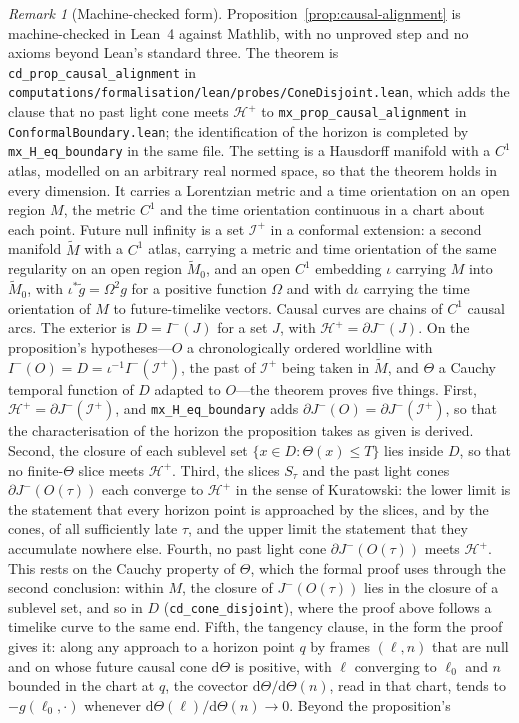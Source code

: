 \documentclass[11pt,a4paper]{article}
\theoremstyle{plain}
\theoremstyle{remark}
\newtheorem{remark}{Remark}
\begin{document}
\begin{remark}[Machine-checked form]\label{rem:formalised}
Proposition~\ref{prop:causal-alignment} is machine-checked in Lean~4 against Mathlib, with no unproved step and no axioms beyond Lean's standard three. The theorem is \texttt{cd\_prop\_causal\_alignment} in \texttt{computations/formalisation/lean/probes/ConeDisjoint.lean}, which adds the clause that no past light cone meets $\mathcal{H}^+$ to \texttt{mx\_prop\_causal\_alignment} in \texttt{ConformalBoundary.lean}; the identification of the horizon is completed by \texttt{mx\_H\_eq\_boundary} in the same file. The setting is a Hausdorff manifold with a $C^{1}$ atlas, modelled on an arbitrary real normed space, so that the theorem holds in every dimension. It carries a Lorentzian metric and a time orientation on an open region $M$, the metric $C^{1}$ and the time orientation continuous in a chart about each point. Future null infinity is a set $\mathscr{I}^+$ in a conformal extension: a second manifold $\tilde M$ with a $C^{1}$ atlas, carrying a metric and time orientation of the same regularity on an open region $\tilde M_0$, and an open $C^{1}$ embedding $\iota$ carrying $M$ into $\tilde M_0$, with $\iota^{*}\tilde g=\Omega^{2}g$ for a positive function $\Omega$ and with $\mathrm{d}\iota$ carrying the time orientation of $M$ to future-timelike vectors. Causal curves are chains of $C^{1}$ causal arcs. The exterior is $D=I^-(J)$ for a set $J$, with $\mathcal{H}^+=\partial J^-(J)$. On the proposition's hypotheses---$O$ a chronologically ordered worldline with $I^-(O)=D=\iota^{-1}I^-(\mathscr{I}^+)$, the past of $\mathscr{I}^+$ being taken in $\tilde M$, and $\Theta$ a Cauchy temporal function of $D$ adapted to $O$---the theorem proves five things. First, $\mathcal{H}^+=\partial J^-(\mathscr{I}^+)$, and \texttt{mx\_H\_eq\_boundary} adds $\partial J^-(O)=\partial J^-(\mathscr{I}^+)$, so that the characterisation of the horizon the proposition takes as given is derived. Second, the closure of each sublevel set $\{x\in D:\Theta(x)\le T\}$ lies inside $D$, so that no finite-$\Theta$ slice meets $\mathcal{H}^+$. Third, the slices $S_\tau$ and the past light cones $\partial J^-(O(\tau))$ each converge to $\mathcal{H}^+$ in the sense of Kuratowski: the lower limit is the statement that every horizon point is approached by the slices, and by the cones, of all sufficiently late $\tau$, and the upper limit the statement that they accumulate nowhere else. Fourth, no past light cone $\partial J^-(O(\tau))$ meets $\mathcal{H}^+$. This rests on the Cauchy property of $\Theta$, which the formal proof uses through the second conclusion: within $M$, the closure of $J^-(O(\tau))$ lies in the closure of a sublevel set, and so in $D$ (\texttt{cd\_cone\_disjoint}), where the proof above follows a timelike curve to the same end. Fifth, the tangency clause, in the form the proof gives it: along any approach to a horizon point $q$ by frames $(\ell,n)$ that are null and on whose future causal cone $\mathrm{d}\Theta$ is positive, with $\ell$ converging to $\ell_0$ and $n$ bounded in the chart at $q$, the covector $\mathrm{d}\Theta/\mathrm{d}\Theta(n)$, read in that chart, tends to $-g(\ell_0,\cdot)$ whenever $\mathrm{d}\Theta(\ell)/\mathrm{d}\Theta(n)\to0$. Beyond the proposition's 
\end{remark}
\end{document}
